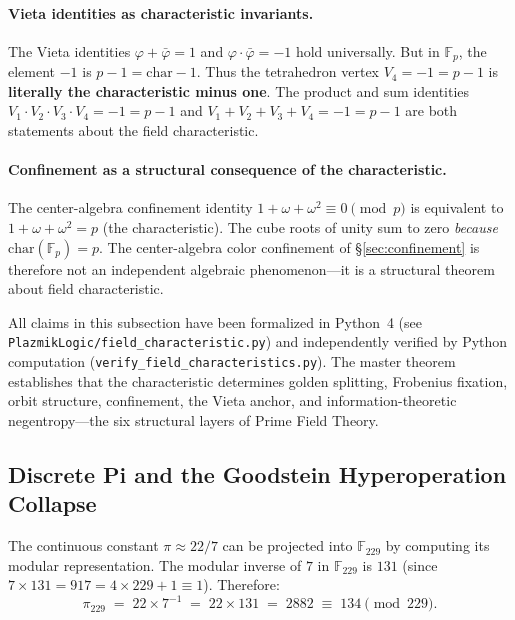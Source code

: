 \paragraph{Vieta identities as characteristic invariants.}
The Vieta identities $\varphi + \bar\varphi = 1$ and $\varphi \cdot \bar\varphi = -1$ hold universally. But in $\mathbb{F}_p$, the element $-1$ is $p - 1 = \mathrm{char} - 1$. Thus the tetrahedron vertex $V_4 = -1 = p - 1$ is \textbf{literally the characteristic minus one}. The product and sum identities $V_1 \cdot V_2 \cdot V_3 \cdot V_4 = -1 = p - 1$ and $V_1 + V_2 + V_3 + V_4 = -1 = p - 1$ are both statements about the field characteristic.

\paragraph{Confinement as a structural consequence of the characteristic.}
The center-algebra confinement identity $1 + \omega + \omega^2 \equiv 0 \pmod{p}$ is equivalent to $1 + \omega + \omega^2 = p$ (the characteristic). The cube roots of unity sum to zero \emph{because} $\mathrm{char}(\mathbb{F}_p) = p$. The center-algebra color confinement of \S\ref{sec:confinement} is therefore not an independent algebraic phenomenon---it is a structural theorem about field characteristic.

\begin{remark}
All claims in this subsection have been formalized in Python~4 (see \texttt{PlazmikLogic/field\_characteristic.py}) and independently verified by Python computation (\texttt{verify\_field\_characteristics.py}). The master theorem establishes that the characteristic determines golden splitting, Frobenius fixation, orbit structure, confinement, the Vieta anchor, and information-theoretic negentropy---the six structural layers of Prime Field Theory.
\end{remark}

\subsection{Discrete Pi and the Goodstein Hyperoperation Collapse}
\label{sec:pi_hyperops}

The continuous constant $\pi \approx 22/7$ can be projected into $\mathbb{F}_{229}$ by computing its modular representation. The modular inverse of $7$ in $\mathbb{F}_{229}$ is $131$ (since $7 \times 131 = 917 = 4 \times 229 + 1 \equiv 1$). Therefore:
\[
\pi_{229} \;=\; 22 \times 7^{-1} \;=\; 22 \times 131 \;=\; 2882 \;\equiv\; 134 \pmod{229}.
\]


